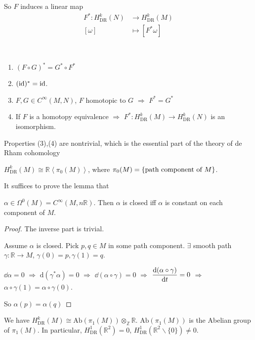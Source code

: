 So  $ F $ induces a linear map
\begin{equation*}
    \begin{aligned}
        F^*:H^k_{\mathrm{DR}}(N)&\rightarrow H^k_{\mathrm{DR}}(M)\\
        [\omega]&\mapsto [F^*\omega]
    \end{aligned}
\end{equation*}
\begin{proposition}\label{key properties of de Rham cohomology}
    \,
    \begin{enumerate}[label=(\arabic*)]
        \item  $ (F\circ G)^*=G^* \circ F^* $
        \item  $ (\mathrm{id})^*=\mathrm{id} $.
        \item  $ F,G\in C^\infty(M,N) $,  $ F $ homotopic to  $ G $ $ \Rightarrow  $ $ F^*=G^* $
        \item If  $ F $ is a homotopy equivalence $ \Rightarrow $  $ F^*:H^k_{\mathrm{DR}}(M)\rightarrow H^k_{\mathrm{DR}}(N) $  is an isomorphism.
    \end{enumerate}
\end{proposition}
\begin{remark}
    Properties (3),(4) are nontrivial, which is the essential part of the theory of de Rham cohomology
\end{remark}
\begin{proposition}\label{Computation of cohomology at 0}
     $ H^k_{\mathrm{DR}}(M)\cong \mathbb{R} \left<\pi_0(M)\right>$, where  $ \pi_0(M)=\{\text{path component of  $ M $}\} $.
\end{proposition}
It suffices to prove the lemma that
\begin{lemma}
     $ \alpha\in \Omega^0(M)=C^\infty(M,n\mathbb{R}) $. Then $ \alpha $ is closed iff  $ \alpha $  is constant on each component of  $ M $.
\end{lemma}
\begin{proof}
    The inverse part is trivial.

    Assume  $ \alpha $ is closed. Pick  $ p,q\in M $ in some path component.  $ \exists $ smooth path  $ \gamma:\mathbb{R}\rightarrow M $,  $ \gamma(0)=p,\gamma(1)=q $.

    $ \dd \alpha=0 $ $ \Rightarrow  $  $ \mathrm{d}(\gamma^*\alpha)=0 $ $ \Rightarrow  $  $ \dd(\alpha\circ \gamma)=0 $  $ \Rightarrow $ $ \displaystyle\frac{\mathrm{d} (\alpha\circ \gamma)}{\mathrm{d} t}=0 $ $ \Rightarrow  $ $ \alpha\circ \gamma(1)=\alpha\circ\gamma(0) $.

    So  $ \alpha(p)=\alpha(q) $
\end{proof}
We have  $ H^k_{\mathrm{DR}}(M)\cong \mathrm{Ab}(\pi_1(M))\otimes_\mathbb{Z} \mathbb{R} $.  $  \mathrm{Ab}(\pi_1(M)) $ is the Abelian group of  $ \pi_1(M) $. In particular,  $ H^1_{\mathrm{DR}}(\mathbb R^2)=0 $,  $ H^1_{\mathrm{DR}}(\mathbb R^2\backslash \{0\})\neq 0 $.

